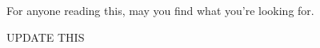 \documentclass[serif]{sfuthesis}
\begin{document}
\begin{dedication} %
	For anyone reading this, may you find what you're looking for.
\end{dedication}


\begin{acknowledgements} %
	UPDATE THIS
\end{acknowledgements}

\tableofcontents\clearpage
{}\listoftables\clearpage
{}\listoffigures





%
%

\mainmatter%













%
%

\backmatter%
	


%


\end{document}
